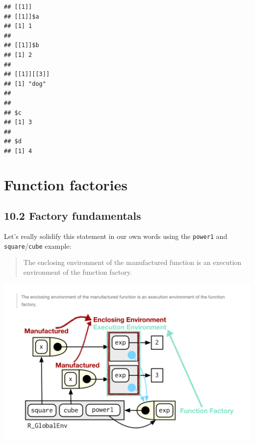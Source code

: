 \documentclass[]{book}
\newenvironment{Shaded}{\begin{snugshade}}{\end{snugshade}}
\newcommand{\CharTok}[1]{\textcolor[rgb]{0.31,0.60,0.02}{#1}}
\newcommand{\ControlFlowTok}[1]{\textcolor[rgb]{0.13,0.29,0.53}{\textbf{#1}}}
\newcommand{\DataTypeTok}[1]{\textcolor[rgb]{0.13,0.29,0.53}{#1}}
\newcommand{\DecValTok}[1]{\textcolor[rgb]{0.00,0.00,0.81}{#1}}
\newcommand{\KeywordTok}[1]{\textcolor[rgb]{0.13,0.29,0.53}{\textbf{#1}}}
\newcommand{\NormalTok}[1]{#1}
\newcommand{\OperatorTok}[1]{\textcolor[rgb]{0.81,0.36,0.00}{\textbf{#1}}}
\newcommand{\StringTok}[1]{\textcolor[rgb]{0.31,0.60,0.02}{#1}}
\begin{document}
\begin{Shaded}
\end{Shaded}

\begin{verbatim}
## [[1]]
## [[1]]$a
## [1] 1
## 
## [[1]]$b
## [1] 2
## 
## [[1]][[3]]
## [1] "dog"
## 
## 
## $c
## [1] 3
## 
## $d
## [1] 4
\end{verbatim}

\hypertarget{function-factories}{%
\chapter{Function factories}\label{function-factories}}

\hypertarget{factory-fundamentals}{%
\section*{10.2 Factory fundamentals}\label{factory-fundamentals}}

Let's really solidify this statement in our own words using the \texttt{power1} and \texttt{square}/\texttt{cube} example:

\begin{quote}
The enclosing environment of the manufactured function is an execution environment of the function factory.
\end{quote}

\includegraphics[width=24.25in]{images/factories1}
\end{document}
